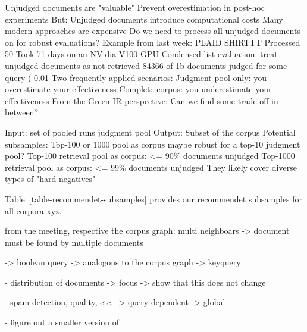 Unjudged documents are "valuable"
Prevent overestimation in post-hoc experiments
But: Unjudged documents introduce computational costs
Many modern approaches are expensive
Do we need to process all unjudged documents on for robust evaluations?
Example from last week: PLAID SHIRTTT
Processed 50%
Took 71 days on an NVidia V100 GPU
Condensed list evaluation: treat unjudged documents as not retrieved
84366 of 1b documents judged for some query ( 0.01%
Two frequently applied scenarios:
Judgment pool only: you overestimate your effectiveness
Complete corpus: you underestimate your effectiveness
From the Green IR perspective: Can we find some trade-off in between?


Input:
set of pooled runs
judgment pool
Output:
Subset of the corpus
Potential subsamples:
Top-100 or 1000 pool as corpus maybe robust for a top-10 judgment pool?
Top-100 retrieval pool as corpus: <= 90\% documents unjudged
Top-1000 retrieval pool as corpus: <= 99\% documents unjudged
They likely cover diverse types of "hard negatives"



Table~\ref{table-recommendet-subsamples} provides our recommendet subsamples for all corpora xyz.



from the meeting, respective the corpus graph:
multi neighboars
 -> document must be found by multiple documents
 
 -> boolean query
 -> analogous to the corpus graph
 -> keyquery
 
- distribution of documents
  -> focus 
  -> show that this does not change
  
- spam detection, quality, etc.
  -> query dependent
  -> global 

- figure out a smaller version of 



